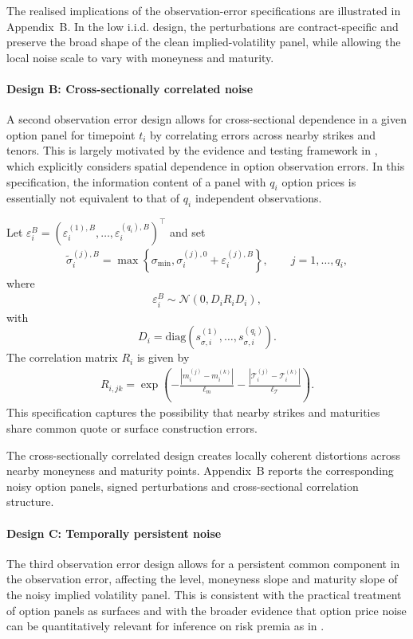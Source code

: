 \documentclass[11pt,a4paper,notitlepage]{article}
\numberwithin{equation}{section}
\begin{document}
The realised implications of the observation-error specifications are illustrated in Appendix~B. In the low i.i.d. design, the perturbations are contract-specific and preserve the broad shape of the clean implied-volatility panel, while allowing the local noise scale to vary with moneyness and maturity.

\paragraph{Design B: Cross-sectionally correlated noise}
A second observation error design allows for cross-sectional dependence in a given option panel for timepoint $t_i$ by correlating errors across nearby strikes and tenors. This is largely motivated by the evidence and testing framework in \cite{andersen2021spatial}, which explicitly considers spatial dependence in option observation errors. In this specification, the information content of a panel with $q_i$ option prices is essentially not equivalent to that of $q_i$ independent observations.

Let
$\varepsilon_i^B=\left(\varepsilon_i^{(1),B},\ldots,\varepsilon_i^{(q_i),B}\right)^\top$ and set
\begin{align}
\tilde\sigma_i^{(j),B}
=
\max\left\{
\sigma_{\min},
\sigma_i^{(j),0}
+
\varepsilon_i^{(j),B}
\right\},
\qquad
j=1,\ldots,q_i,
\label{eq:noise_spatial_iv}
\end{align}
where
\begin{align}
\varepsilon_i^B\sim\mathcal{N}(0,D_i R_i D_i),
\label{eq:noise_spatial}
\end{align}
with
\[
D_i=\mathrm{diag}\left(s_{\sigma,i}^{(1)},\ldots,s_{\sigma,i}^{(q_i)}\right).
\]
The correlation matrix $R_i$ is given by
\begin{align}
R_{i,jk}
=
\exp\left(
-\frac{|m_i^{(j)}-m_i^{(k)}|}{\ell_m}
-\frac{|\mathcal T_i^{(j)}-\mathcal T_i^{(k)}|}{\ell_{\mathcal T}}
\right).
\label{eq:spatial_kernel}
\end{align}
This specification captures the possibility that nearby strikes and maturities share common quote or surface construction errors.

The cross-sectionally correlated design creates locally coherent distortions across nearby moneyness and maturity points. Appendix~B reports the corresponding noisy option panels, signed perturbations and cross-sectional correlation structure.

\paragraph{Design C: Temporally persistent noise}
The third observation error design allows for a persistent common component in the observation error, affecting the level, moneyness slope and maturity slope of the noisy implied volatility panel. This is consistent with the practical treatment of option panels as surfaces and with the broader evidence that option price noise can be quantitatively relevant for inference on risk premia as in \cite{duarte2024very}.
\end{document}

